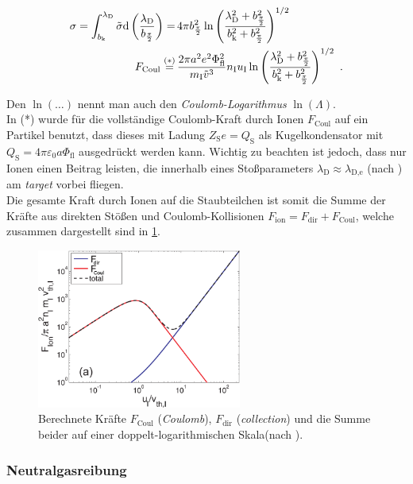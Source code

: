 \documentclass[numbers=noenddot,a4paper]{scrartcl}
\newcommand{\diff}{\textnormal{d}}
\newcommand{\ix}[1]{_\text{#1}}
\newcommand{\tilt}[1]{\textit{#1}}
\begin{document}
					\begin{align}
						\sigma=\int_{b\ix{k}}^{\lambda\ix{D}}\tilde{\sigma}\diff\left(\frac{\lambda\ix{D}}{b_{\frac{\pi}{2}}}\right)=&\,4\pi b_{\frac{\pi}{2}}^2\ln\left(\frac{\lambda\ix{D}^2+b_{\frac{\pi}{2}}^2}{b\ix{k}^2+b_{\frac{\pi}{2}}^2}\right)^{1/2} \nonumber \\
						F\ix{Coul}\overset{(*)}{=}&\,\frac{2\pi a^2 e^2\Phi\ix{fl}^2}{m\ix{I}\tilde{v}^3}n\ix{I}u\ix{I}\ln\left(\frac{\lambda\ix{D}^2+b_{\frac{\pi}{2}}^2}{b\ix{k}^2+b_{\frac{\pi}{2}}^2}\right)^{1/2} \, \, .
					\end{align}

				Den $\ln\left(\dots\right)$ nennt man auch den \tilt{Coulomb-Logarithmus} $\ln\left(\Lambda\right)$.\\
				In (*) wurde für die vollständige Coulomb-Kraft durch Ionen $F\ix{Coul}$ auf ein Partikel benutzt, dass dieses mit Ladung $Z\ix{S}e=Q\ix{S}$ als Kugelkondensator mit $Q\ix{S}=4\pi\varepsilon\ix{0}a\Phi\ix{fl}$ ausgedrückt werden kann. Wichtig zu beachten ist jedoch, dass nur Ionen einen Beitrag leisten, die innerhalb eines Stoßparameters $\lambda\ix{D}\approx\lambda\ix{D,e}$ (nach \cite{Kilgore93}) am \tilt{target} vorbei fliegen.\\
				Die gesamte Kraft durch Ionen auf die Staubteilchen ist somit die Summe der Kräfte aus direkten Stößen und Coulomb-Kollisionen $F\ix{ion}=F\ix{dir}+F\ix{Coul}$, welche zusammen dargestellt sind in \ref{img:ionkräfte}.

					\begin{figure}
						\centering
						\includegraphics[height=0.4\textwidth,width=0.6\textwidth]{figs/forcesandtrappingmelzer.png}
						\caption{Berechnete Kräfte $F\ix{Coul}$ (\tilt{Coulomb}), $F\ix{dir}$ (\tilt{collection}) und die Summe beider auf einer doppelt-logarithmischen Skala(nach \cite{Melzer12}).}
						\label{img:ionkräfte}
					\end{figure}

		\subsubsection{Neutralgasreibung}
\end{document}
